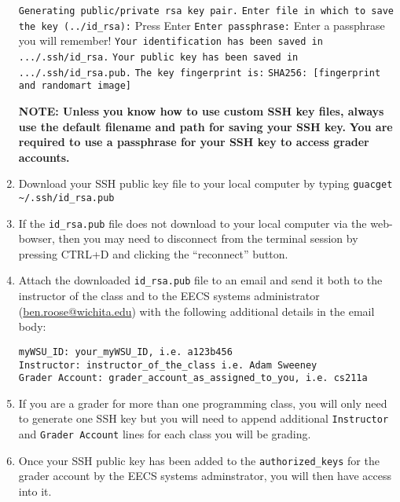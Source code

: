 \documentclass[12pt]{article}
\begin{document}
\begin{flushleft}
\begin{enumerate}
      \texttt{Generating public/private rsa key pair.} \break
      \texttt{Enter file in which to save the key (../id\_rsa):} Press Enter \break
      \texttt{Enter passphrase:} Enter a passphrase you will remember! \break
      \texttt{Your identification has been saved in .../.ssh/id\_rsa.} \break
      \texttt{Your public key has been saved in .../.ssh/id\_rsa.pub.} \break
      \texttt{The key fingerprint is:} \break
      \texttt{SHA256: [fingerprint and randomart image]}
      
      \textbf{NOTE: Unless you know how to use custom SSH key files, always use the default filename and path for saving your SSH key.} \break
      \textbf{You are required to use a passphrase for your SSH key to access grader accounts.}
    
  \item Download your SSH public key file to your local computer by typing \break
    \verb|guacget ~/.ssh/id_rsa.pub|
  \item If the \verb|id_rsa.pub| file does not download to your local computer via the web-bowser, then you may need to disconnect from the terminal session by pressing CTRL+D and clicking the ``reconnect'' button.
  \item Attach the downloaded \verb|id_rsa.pub| file to an email and send it both to the instructor of the class and to the EECS systems administrator (\href{mailto:ben.roose@wichita.edu}{ben.roose@wichita.edu}) with the following additional details in the email body:
\begin{verbatim}
myWSU_ID: your_myWSU_ID, i.e. a123b456
Instructor: instructor_of_the_class i.e. Adam Sweeney
Grader Account: grader_account_as_assigned_to_you, i.e. cs211a
\end{verbatim}
  \item If you are a grader for more than one programming class, you will only need to generate one SSH key but you will need to append additional \texttt{Instructor} and \texttt{Grader Account} lines for each class you will be grading.
 \item Once your SSH public key has been added to the \verb|authorized_keys| for the grader account by the EECS systems adminstrator, you will then have access into it.
\end{enumerate}



\end{flushleft}
\end{document}
